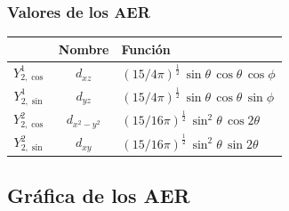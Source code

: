 \documentclass[12pt]{beamer}
\begin{document}
\begin{frame}
\frametitle{Valores de los AER}
\begin{table}[H]
\centering
\renewcommand{\arraystretch}{1.5}
\begin{tabular}{|c | c | l|} \hline
& Nombre & Función \\ \hline
$Y_{2, \cos}^{1}$ & $d_{xz}$ & $(15/4 \pi)^{\frac{1}{2}} \, \sin \theta \, \cos \theta \, \cos \phi$ \\ \hline
$Y_{2, \sin}^{1}$ & $d_{yz}$ & $(15/4 \pi)^{\frac{1}{2}} \, \sin \theta \, \cos \theta \, \sin \phi$ \\ \hline
$Y_{2, \cos}^{2}$ & $d_{x^{2}-y^{2}}$ & $(15/16 \pi)^{\frac{1}{2}} \, \sin^{2} \theta \, \cos 2 \theta$ \\ \hline
$Y_{2, \sin}^{2}$ & $d_{xy}$ & $(15/16 \pi)^{\frac{1}{2}} \, \sin^{2} \theta \, \sin 2 \theta$ \\ \hline
\end{tabular}
\end{table}
\end{frame}

\subsection{Gráfica de los AER}
\end{document}
